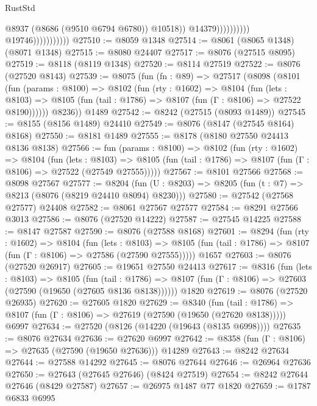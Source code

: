 \begin{lexlean}{RustStd}
\begin{coremodule}
                                                  @8937
                                                  (@8686 (@9510 @6794 @6780))
                                                  @10518))
                                              @14379))))))))))
                          @19746)))))))))))
@27510 := @8059 @1348
@27514 := @8061 (@8065 @1348) (@8071 @1348)
@27515 := @8080 @24407
@27517 := @8076 (@27515 @8095)
@27519 := @8118 (@8119 @1348)
@27520 := @8114 @27519
@27522 := @8076 (@27520 @8143)
@27539 := @8075
    (fun (fn : @89) =>
    @27517
      (@8098
        (@8101
          (fun (params : @8100) =>
          @8102
            (fun (rty : @1602) =>
            @8104
              (fun (lets : @8103) =>
              @8105 (fun (tail : @1786) => @8107 (fun (Γ : @8106) => @27522 @8190))))))
        @8236))
    @1489
@27542 := @8242 (@27515 (@8093 @1489))
@27545 := @8155 (@8156 @1489) @24410
@27549 := @8076 (@8147 (@27545 @8164) @8168)
@27550 := @8181 @1489
@27555 := @8178 (@8180 @27550 @24413 @8136 @8138)
@27566 := fun (params : @8100) =>
  @8102
    (fun (rty : @1602) =>
    @8104
      (fun (lets : @8103) =>
      @8105 (fun (tail : @1786) => @8107 (fun (Γ : @8106) => @27522 (@27549 @27555)))))
@27567 := @8101 @27566
@27568 := @8098 @27567
@27577 := @8204
    (fun (U : @8203) => @8205 (fun (t : @7) => @8213 (@8076 (@8219 @24410 @8094) @8230)))
@27580 := @27542 (@27568 @27577) @24408
@27582 := @8061 @27567 @27577
@27584 := @8291 @27566 @3013
@27586 := @8076 (@27520 @14222)
@27587 := @27545 @14225
@27588 := @8147 @27587
@27590 := @8076 (@27588 @8168)
@27601 := @8294
    (fun (rty : @1602) =>
    @8104
      (fun (lets : @8103) =>
      @8105 (fun (tail : @1786) => @8107 (fun (Γ : @8106) => @27586 (@27590 @27555)))))
    @1657
@27603 := @8076 (@27520 @26917)
@27605 := @19651 @27550 @24413
@27617 := @8316
    (fun (lets : @8103) =>
    @8105
      (fun (tail : @1786) =>
      @8107 (fun (Γ : @8106) => @27603 (@27590 (@19650 (@27605 @8136 @8138))))))
    @1820
@27619 := @8076 (@27520 @26935)
@27620 := @27605 @1820
@27629 := @8340
    (fun (tail : @1786) => @8107 (fun (Γ : @8106) => @27619 (@27590 (@19650 (@27620 @8138)))))
    @6997
@27634 := @27520 (@8126 (@14220 (@19643 (@8135 @6998))))
@27635 := @8076 @27634
@27636 := @27620 @6997
@27642 := @8358 (fun (Γ : @8106) => @27635 (@27590 (@19650 @27636))) @14289
@27643 := @8242 @27634
@27644 := @27588 @14292
@27645 := @8076 @27644
@27646 := @26964 @27636
@27650 := @27643 (@27645 @27646) (@8424 @27519)
@27654 := @8242 @27644 @27646 (@8429 @27587)
@27657 := @26975 @1487 @77 @1820
@27659 := @1787 @6833 @6995

\end{coremodule}
\end{lexlean}
